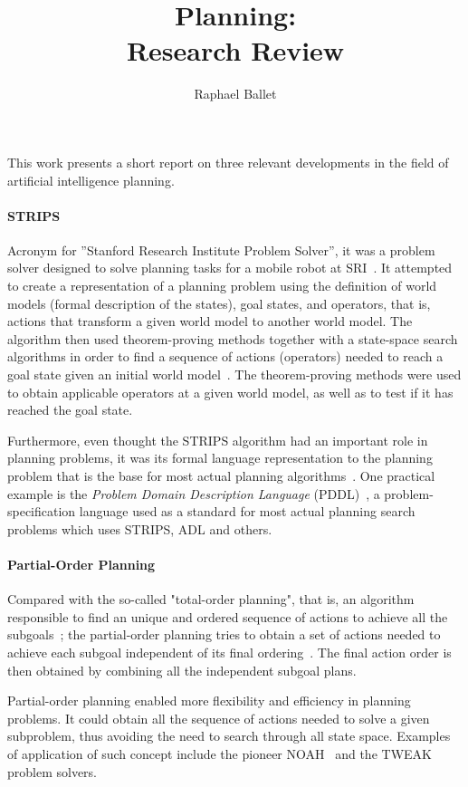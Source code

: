 \documentclass[12pt, a4paper]{article}
\title{Planning: \\Research Review}
\author{Raphael Ballet}
\date{}
\begin{document}
	\maketitle
	
	This work presents a short report on three relevant developments in the field of artificial intelligence planning.

\paragraph{STRIPS} Acronym for ''Stanford Research Institute Problem Solver'', it was a problem solver designed to solve planning tasks for a mobile robot at SRI~\citep{Fikes1993}. It attempted to create a representation of a planning problem using the definition of world models (formal description of the states), goal states, and operators, that is, actions that transform a given world model to another world model. The algorithm then used theorem-proving methods together with a state-space search algorithms in order to find a sequence of actions (operators) needed to reach a goal state given an initial world model~\citep{Fikes1971}. The theorem-proving methods were used to obtain applicable operators at a given world model, as well as to test if it has reached the goal state. 

Furthermore, even thought the STRIPS algorithm had an important role in planning problems, it was its formal language representation to the planning problem that is the base for most actual planning algorithms~\citep{Russell2009}. One practical example is the \textit{Problem Domain Description Language} (PDDL)~\citep{McDermott1998}, a problem-specification language used as a standard for most actual planning search problems which uses STRIPS, ADL and others.

\paragraph{Partial-Order Planning} Compared with the so-called "total-order planning", that is, an algorithm responsible to find an unique and ordered sequence of actions to achieve all the subgoals~\citep{Russell2009}; the partial-order planning tries to obtain a set of actions needed to achieve each subgoal independent of its final ordering~\citep{Sacerdoti1975}. The final action order is then obtained by combining all the independent subgoal plans. 

Partial-order planning enabled more flexibility and efficiency in planning problems. It could obtain all the sequence of actions needed to solve a given subproblem, thus avoiding the need to search through all state space. Examples of application of such concept include the pioneer NOAH~\citep{Sacerdoti1975} and the TWEAK~\citep{Chapman1987} problem solvers.
\end{document}
